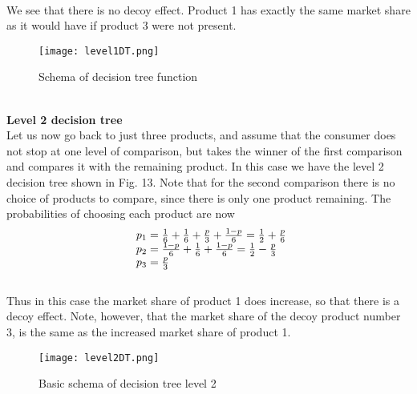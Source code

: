 \\
We see that there is no decoy effect. Product 1 has exactly the same market share as it would have if product 3 were not present.\\
\begin{figure}[h!]
	\begin{center}
		\texttt{[image: level1DT.png]}
	\end{center}
	\caption{Schema of decision tree function}
	\label{Decision tree level 1}
\end{figure}
\\
\textbf{Level 2 decision tree}\\
Let us now go back to just three products, and assume that the consumer does not stop at one level of comparison,
but takes the winner of the first comparison and compares it with the remaining product. In this case
we have the level 2 decision tree shown in Fig. 13. Note that for the second comparison there is no
choice of products to compare, since there is only one product remaining. The probabilities of choosing each product are now~\cite{patel}\\
\begin{equation} \label{eq:14}
\begin{array}{l@{}l}
p_1 = \frac{1}{6}+\frac{1}{6}+\frac{p}{3}+\frac{1-p}{6}=\frac{1}{2}+\frac{p}{6} \\
p_2 = \frac{1-p}{6}+\frac{1}{6}+\frac{1-p}{6}=\frac{1}{2}-\frac{p}{3} \\
p_3 = \frac{p}{3}
\end{array}
\end{equation}
\\
Thus in this case the market share of product 1 does increase, so that there is a decoy effect.
Note, however, that the market share of the decoy product number 3, is the same as the increased market share of product 1.
\\
\begin{figure}[h!]
	\begin{center}
		\texttt{[image: level2DT.png]}
	\end{center}
	\caption{Basic schema of decision tree level 2}
	\label{Decision tree level 2}
\end{figure}
\newpage
